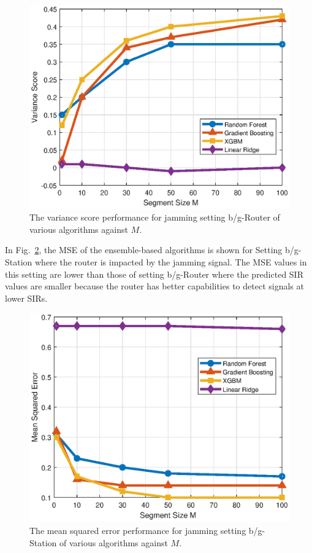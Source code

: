 \begin{figure}[!ht]
	\centering
	\includegraphics[width=0.9\columnwidth]{./chapter-ftml/plots/001_R2_M.eps}
	\caption{The variance score performance for jamming setting b/g-Router of various algorithms against $M$.}
	\label{ftml-jrnl:fig:001_R2_M}      
\end{figure}

In Fig.~\ref{ftml-jrnl:fig:002_MSE_M}, the MSE of the ensemble-based algorithms is shown for Setting b/g-Station where the router is impacted by the jamming signal. The MSE values in this setting are lower than those of setting b/g-Router where the predicted SIR values are smaller because the router has better capabilities to detect signals at lower SIRs.    
\begin{figure}[!ht]
	\centering
	\includegraphics[width=0.9\columnwidth]{./chapter-ftml/plots/002_MSE_M.eps}
	\caption{The mean squared error performance for jamming setting b/g-Station of various algorithms against $M$.}
	\label{ftml-jrnl:fig:002_MSE_M}      
\end{figure}

